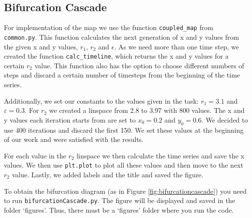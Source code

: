 \subsection{Bifurcation Cascade}
For implementation of the map we use the function \verb+coupled_map+ from \verb+common.py+. This function calculates the next generation
 of x and y values from the given x and y values, $r_1$, $r_2$ and $\epsilon$. As we need more than one time step, we created the 
 function \verb+calc_timeline+, which returns the x and y values for a certain $r_2$ value. This function also has the option to choose 
 different numbers of steps and discard a certain number of timesteps from the beginning of the time series.

Additionally, we set our constants to the values given in the task: $r_1 = 3.1$ and $\varepsilon=0.3$. For $r_2$ we created a linspace 
from 2.8 to 3.97 with 800 values. The x and y values each iteration starts from are set to $x_0=0.2$ and $y_0=0.6$. 
We decided to use 400 iterations and discard the first 150. We set these values at the beginning of our work and were satisfied with the results.
 
For each value in the $r_2$ linspace we then calculate the time series and save the x values. We then use \verb+plt.plot+ to plot all these 
values and then move to the next $r_2$ value. Lastly, we added labels and the title and saved the figure.

To obtain the bifurcation diagram (as in Figure \ref{fig:bifurcationcascade}) you need to run \verb+bifurcationCascade.py+. The figure will be displayed and saved 
in the folder `figures'. Thus, there must be a `figures' folder where you run the code. 
